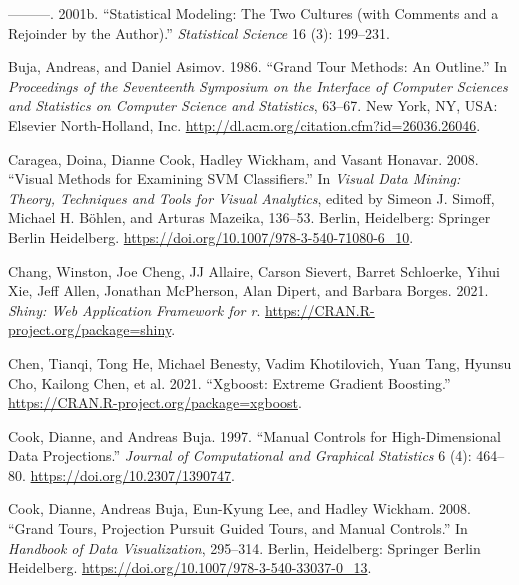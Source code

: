 \documentclass[
]{article}
\newlength{\cslhangindent}
\newlength{\cslentryspacingunit} %
\newenvironment{CSLReferences}[2] %
 {%
  \setlength{\parindent}{0pt}
  \ifodd #1
  \let\oldpar\par
  \def\par{\hangindent=\cslhangindent\oldpar}
  \fi
  \setlength{\parskip}{#2\cslentryspacingunit}
 }%
 {}
\begin{document}
\begin{CSLReferences}{1}{0}
\leavevmode{}%
---------. 2001b. {``Statistical Modeling: {The} Two Cultures (with Comments and a Rejoinder by the Author).''} \emph{Statistical Science} 16 (3): 199--231.

\leavevmode{}%
Buja, Andreas, and Daniel Asimov. 1986. {``Grand {Tour} {Methods}: {An} {Outline}.''} In \emph{Proceedings of the {Seventeenth} {Symposium} on the {Interface} of {Computer} {Sciences} and {Statistics} on {Computer} {Science} and {Statistics}}, 63--67. New York, NY, USA: Elsevier North-Holland, Inc. \url{http://dl.acm.org/citation.cfm?id=26036.26046}.

\leavevmode{}%
Caragea, Doina, Dianne Cook, Hadley Wickham, and Vasant Honavar. 2008. {``Visual Methods for Examining SVM Classifiers.''} In \emph{Visual Data Mining: Theory, Techniques and Tools for Visual Analytics}, edited by Simeon J. Simoff, Michael H. Böhlen, and Arturas Mazeika, 136--53. Berlin, Heidelberg: Springer Berlin Heidelberg. \url{https://doi.org/10.1007/978-3-540-71080-6_10}.

\leavevmode{}%
Chang, Winston, Joe Cheng, JJ Allaire, Carson Sievert, Barret Schloerke, Yihui Xie, Jeff Allen, Jonathan McPherson, Alan Dipert, and Barbara Borges. 2021. \emph{Shiny: Web Application Framework for r}. \url{https://CRAN.R-project.org/package=shiny}.

\leavevmode{}%
Chen, Tianqi, Tong He, Michael Benesty, Vadim Khotilovich, Yuan Tang, Hyunsu Cho, Kailong Chen, et al. 2021. {``Xgboost: {Extreme} {Gradient} {Boosting}.''} \url{https://CRAN.R-project.org/package=xgboost}.

\leavevmode{}%
Cook, Dianne, and Andreas Buja. 1997. {``Manual {Controls} for {High}-{Dimensional} {Data} {Projections}.''} \emph{Journal of Computational and Graphical Statistics} 6 (4): 464--80. \url{https://doi.org/10.2307/1390747}.

\leavevmode{}%
Cook, Dianne, Andreas Buja, Eun-Kyung Lee, and Hadley Wickham. 2008. {``Grand {Tours}, {Projection} {Pursuit} {Guided} {Tours}, and {Manual} {Controls}.''} In \emph{Handbook of {Data} {Visualization}}, 295--314. Berlin, Heidelberg: Springer Berlin Heidelberg. \url{https://doi.org/10.1007/978-3-540-33037-0_13}.


\end{CSLReferences}
\end{document}
